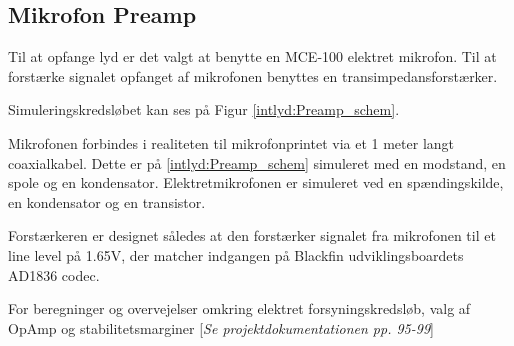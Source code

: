 \subsection{Mikrofon Preamp}
Til at opfange lyd er det valgt at benytte en MCE-100 elektret mikrofon. Til at forstærke signalet opfanget af mikrofonen benyttes en transimpedansforstærker. 

Simuleringskredsløbet kan ses på Figur \ref{intlyd:Preamp_schem}.	


Mikrofonen forbindes i realiteten til mikrofonprintet via et 1 meter langt coaxialkabel. Dette er på \ref{intlyd:Preamp_schem} simuleret med en modstand, en spole og en kondensator. Elektretmikrofonen er simuleret ved en spændingskilde, en kondensator og en transistor. 

Forstærkeren er designet således at den forstærker signalet fra mikrofonen til et line level på 1.65V, der matcher indgangen på Blackfin udviklingsboardets AD1836 codec. 

For beregninger og overvejelser omkring elektret forsyningskredsløb, valg af OpAmp og stabilitetsmarginer [\textit{Se projektdokumentationen pp. 95-99}]